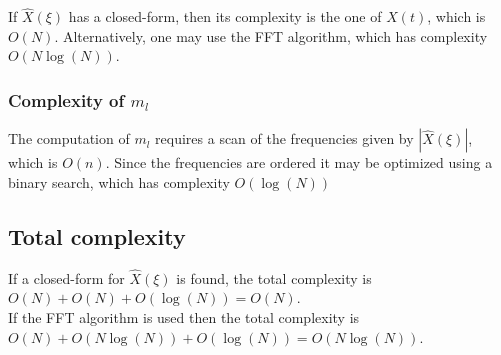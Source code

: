 \documentclass{article}
\begin{document}
If \(\hat{X}(\xi)\) has a closed-form,
then its complexity is the one of \(X(t)\),
which is \(O(N)\).
Alternatively, one may use the FFT algorithm,
which has complexity \(O(N \log(N))\).

\subsubsection{Complexity of \(m_l\)}

The computation of \(m_l\) requires a scan
of the frequencies given by \(|\hat{X}(\xi)|\),
which is \(O(n)\).
Since the frequencies are ordered it may be optimized
using a binary search, which has complexity \(O(\log(N))\)

\subsection{Total complexity}

If a closed-form for \(\hat{X}(\xi)\) is found,
the total complexity is \(O(N) + O(N) + O(\log(N)) = O(N)\). \\
If the FFT algorithm is used then the total complexity is
\(O(N) + O(N\log(N)) + O(\log(N)) = O(N\log(N))\).

\nocite{*} %
\end{document}
